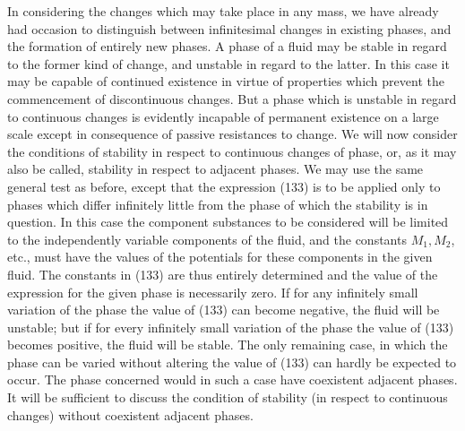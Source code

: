 \documentclass[11pt]{article}
\begin{document}
In considering the changes which may take place in any mass, we have already had occasion to distinguish between infinitesimal changes in existing phases, and the formation of entirely new phases. A phase of a fluid may be stable in regard to the former kind of change, and unstable in regard to the latter. In this case it may be capable of continued existence in virtue of properties which prevent the commencement of discontinuous changes. But a phase which is unstable in regard to continuous changes is evidently incapable of permanent existence on a large scale except in consequence of passive resistances to change. We will now consider the conditions of stability in respect to continuous changes of phase, or, as it may also be called, stability in respect to adjacent phases. We may use the same general test as before, except that the expression (133) is to be applied only to phases which differ infinitely little from the phase of which the stability is in question. In this case the component substances to be considered will be limited to the independently variable components of the fluid, and the constants $M_1,M_2$, etc., must have the values of the potentials for these components in the given fluid. The constants in (133) are thus entirely determined and the value of the expression for the given phase is necessarily zero. If for any infinitely small variation of the phase the value of (133) can become negative, the fluid will be unstable; but if for every infinitely small variation of the phase the value of (133) becomes positive, the fluid will be stable. The only remaining case, in which the phase can be varied without altering the value of (133) can hardly be expected to occur. The phase concerned would in such a case have coexistent adjacent phases. It will be sufficient to discuss the condition of stability (in respect to continuous changes) without coexistent adjacent phases.
\end{document}
